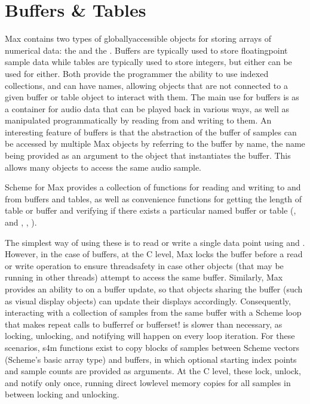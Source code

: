 \documentclass[letterpaper,10pt,english]{sphinxmanual}
\begin{document}
\section{Buffers \& Tables}
\label{\detokenize{features_usage:buffers-tables}}
\sphinxAtStartPar
Max contains two types of globally\sphinxhyphen{}accessible objects for storing arrays of numerical data: the 
and the . Buffers are typically used to store floating\sphinxhyphen{}point sample
data while tables are typically used to store integers, but either can be used for either.
Both provide the programmer the ability to use indexed collections, and can have names,
allowing objects that are not connected to a given buffer or table object
to interact with them. The main use for buffers is as a container
for audio data that can be played back in various ways, as well as
manipulated programmatically by reading from and writing to them.
An interesting feature of buffers is that the abstraction of the buffer
of samples can be accessed by multiple Max objects by referring to the
buffer by name, the name being provided as an argument to the 
object that instantiates the buffer. This allows many objects to access
the same audio sample.

\sphinxAtStartPar
Scheme for Max provides a collection of functions for reading and writing
to and from buffers and tables, as well as convenience functions for
getting the length of table or buffer and verifying if there exists
a particular named buffer or table (, and ,
, ).

\sphinxAtStartPar
The simplest way of using these is to read or write a single data
point using  and .
However, in the case of buffers, at the C level, Max locks the buffer before a read
or write operation to ensure thread\sphinxhyphen{}safety in case other objects (that
may be running in other threads) attempt to access the same buffer.
Similarly, Max provides an ability to  on a buffer update,
so that objects sharing the buffer (such as visual display objects)
can update their displays accordingly.
Consequently, interacting with a collection of samples from the same
buffer with a Scheme loop that makes repeat
calls to buffer\sphinxhyphen{}ref or buffer\sphinxhyphen{}set! is slower than necessary,
as locking, unlocking, and notifying will happen on every loop iteration.
For these scenarios, s4m functions exist to copy blocks of samples between
Scheme vectors (Scheme’s basic array type) and buffers, in
which optional starting index points and sample counts are provided as arguments.
At the C level, these lock, unlock, and notify only once, running
direct low\sphinxhyphen{}level memory copies for all samples in between locking and unlocking.
\end{document}
